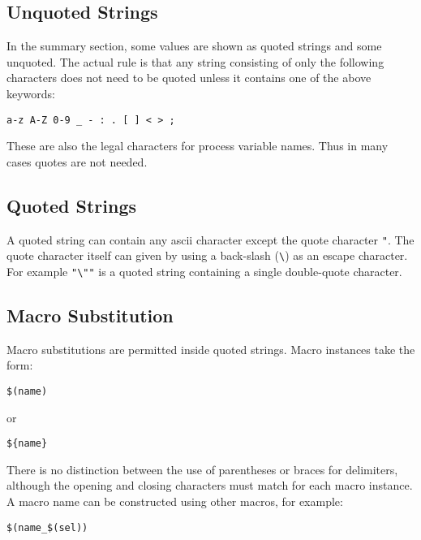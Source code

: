 \subsection{Unquoted Strings}

In the summary section, some values are shown as quoted strings and some unquoted.
The actual rule is that any string consisting of only the following characters does not need to be quoted unless it contains one of the above keywords:

\begin{lstlisting}[language=dbd]
a-z A-Z 0-9 _ - : . [ ] < > ;
\end{lstlisting}

These are also the legal characters for process variable names.
Thus in many cases quotes are not needed.

\subsection{Quoted Strings}

A quoted string can contain any ascii character except the quote character \verb|"|.
The quote character itself can given by using a back-slash (\verb|\|) as an escape character.
For example \verb|"\""| is a quoted string containing a single double-quote character.

\subsection{Macro Substitution}

Macro substitutions are permitted inside quoted strings.
Macro instances take the form:

\begin{lstlisting}[language=dbd]
$(name)
\end{lstlisting}

or

\begin{lstlisting}[language=dbd]
${name}
\end{lstlisting}

There is no distinction between the use of parentheses or braces for delimiters, although the opening and closing characters must match for each macro instance.
A macro name can be constructed using other macros, for example:

\begin{lstlisting}[language=dbd]
$(name_$(sel))
\end{lstlisting}

